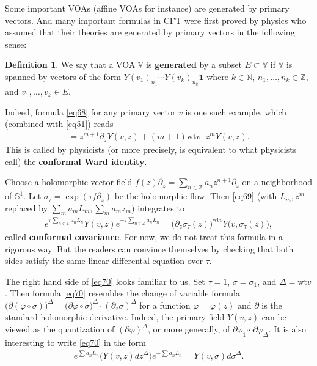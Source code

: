 \documentclass[12pt,a4paper,notitlepage]{article}
\theoremstyle{definition}
\newtheorem{df}{Definition}[section]
\theoremstyle{plain}
\newcommand{\id}{\mathbf{1}}
\newcommand{\Vbb}{\mathbb V}
\newcommand{\Nbb}{\mathbb N}
\newcommand{\Zbb}{\mathbb Z}
\newcommand{\wt}{\mathrm{wt}}
\newcommand{\Sbb}{{\mathbb S}}
\numberwithin{equation}{section}
\begin{document}
Some important VOAs (affine VOAs for instance) are generated by primary vectors. And many important formulas in CFT were first proved by physics who assumed that their theories are generated by primary vectors in the following sense:
\begin{df}\label{lb163} \index{00@Generatig subsets of the VOA $\Vbb$}
	We say that a VOA $\Vbb$ is \textbf{generated} by a subset $E\subset\Vbb$ if $\Vbb$ is spanned by vectors of the form $Y(v_1)_{n_1}\cdots Y(v_k)_{n_k}\id$ where $k\in\Nbb$, $n_1,\dots,n_k\in\Zbb$, and $v_1,\dots,v_k\in E$.
\end{df}
Indeed, formula \eqref{eq68} for any primary vector $v$ is one such example, which (combined with \eqref{eq51}) reads
\begin{align}
	[L_m,Y(v,z)]=z^{m+1}\partial_zY(v,z)+(m+1)\wt v\cdot z^mY(v,z).\label{eq69}
\end{align}
This is called by physicists (or more precisely, is equivalent to what physicists call) the \textbf{conformal Ward identity}. 

Choose a holomorphic vector field $f(z)\partial_z=\sum_{n\in\Zbb} a_n z^{n+1}\partial_z$ on a neighborhood of $\Sbb^1$. Let $\sigma_\tau=\exp(\tau f\partial_z)$ be the holomorphic flow. Then \eqref{eq69} (with $L_m,z^m$ replaced by $\sum_m a_mL_m,\sum_m a_mz_m$) integrates to
\begin{align}
e^{\tau\sum_{n\in\Zbb}a_nL_n}Y(v,z)e^{-\tau\sum_{n\in\Zbb}a_nL_n}=\big(\partial_z\sigma_\tau(z)\big)^{\wt v}Y\big(v,\sigma_\tau(z) \big),\label{eq70}
\end{align}
called \textbf{conformal covariance}.  For now, we do not treat this formula in a rigorous way. But the readers can convince themselves by checking that both sides satisfy the same linear differental equation over $\tau$. 

The right hand side of \eqref{eq70} looks familiar to us. Set $\tau=1$, $\sigma=\sigma_1$, and $\Delta=\wt v$. Then formula \eqref{eq70} resembles the change of variable formula $\big(\partial(\varphi\circ\sigma)\big)^\Delta=\big(\partial\varphi\circ\sigma\big)^\Delta\cdot (\partial_z\sigma)^\Delta$ for a function $\varphi=\varphi(z)$ and $\partial$ is the standard holomorphic derivative. Indeed, the primary field $Y(v,z)$ can be viewed as the quantization of $(\partial\varphi)^\Delta$, or more generally, of $\partial\varphi_1\cdots\partial\varphi_\Delta$. It is also interesting to write \eqref{eq70} in the form
\begin{align}
	e^{\sum a_nL_n}\big(Y(v,z)dz^\Delta \big)e^{-\sum a_nL_n}=Y(v,\sigma)d\sigma^\Delta.
\end{align}
\end{document}

